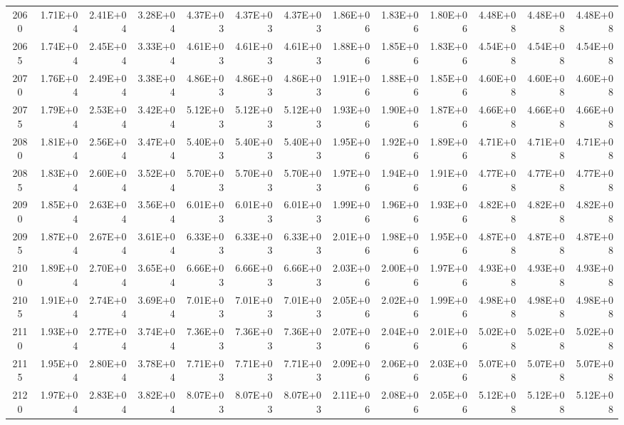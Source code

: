 \documentclass{article}
\begin{document}
\begin{table}
\begin{tabular}{crrr|rrr|rrr|rrr}
2060     & 1.71E+04   & 2.41E+04   & 3.28E+04   & 4.37E+03   & 4.37E+03   & 4.37E+03   & 1.86E+06   & 1.83E+06   & 1.80E+06   & 4.48E+08   & 4.48E+08   & 4.48E+08   \\
2065     & 1.74E+04   & 2.45E+04   & 3.33E+04   & 4.61E+03   & 4.61E+03   & 4.61E+03   & 1.88E+06   & 1.85E+06   & 1.83E+06   & 4.54E+08   & 4.54E+08   & 4.54E+08   \\
2070     & 1.76E+04   & 2.49E+04   & 3.38E+04   & 4.86E+03   & 4.86E+03   & 4.86E+03   & 1.91E+06   & 1.88E+06   & 1.85E+06   & 4.60E+08   & 4.60E+08   & 4.60E+08   \\
2075     & 1.79E+04   & 2.53E+04   & 3.42E+04   & 5.12E+03   & 5.12E+03   & 5.12E+03   & 1.93E+06   & 1.90E+06   & 1.87E+06   & 4.66E+08   & 4.66E+08   & 4.66E+08   \\
2080     & 1.81E+04   & 2.56E+04   & 3.47E+04   & 5.40E+03   & 5.40E+03   & 5.40E+03   & 1.95E+06   & 1.92E+06   & 1.89E+06   & 4.71E+08   & 4.71E+08   & 4.71E+08   \\
2085     & 1.83E+04   & 2.60E+04   & 3.52E+04   & 5.70E+03   & 5.70E+03   & 5.70E+03   & 1.97E+06   & 1.94E+06   & 1.91E+06   & 4.77E+08   & 4.77E+08   & 4.77E+08   \\
2090     & 1.85E+04   & 2.63E+04   & 3.56E+04   & 6.01E+03   & 6.01E+03   & 6.01E+03   & 1.99E+06   & 1.96E+06   & 1.93E+06   & 4.82E+08   & 4.82E+08   & 4.82E+08   \\
2095     & 1.87E+04   & 2.67E+04   & 3.61E+04   & 6.33E+03   & 6.33E+03   & 6.33E+03   & 2.01E+06   & 1.98E+06   & 1.95E+06   & 4.87E+08   & 4.87E+08   & 4.87E+08   \\
2100     & 1.89E+04   & 2.70E+04   & 3.65E+04   & 6.66E+03   & 6.66E+03   & 6.66E+03   & 2.03E+06   & 2.00E+06   & 1.97E+06   & 4.93E+08   & 4.93E+08   & 4.93E+08   \\
2105     & 1.91E+04   & 2.74E+04   & 3.69E+04   & 7.01E+03   & 7.01E+03   & 7.01E+03   & 2.05E+06   & 2.02E+06   & 1.99E+06   & 4.98E+08   & 4.98E+08   & 4.98E+08   \\
2110     & 1.93E+04   & 2.77E+04   & 3.74E+04   & 7.36E+03   & 7.36E+03   & 7.36E+03   & 2.07E+06   & 2.04E+06   & 2.01E+06   & 5.02E+08   & 5.02E+08   & 5.02E+08   \\
2115     & 1.95E+04   & 2.80E+04   & 3.78E+04   & 7.71E+03   & 7.71E+03   & 7.71E+03   & 2.09E+06   & 2.06E+06   & 2.03E+06   & 5.07E+08   & 5.07E+08   & 5.07E+08   \\
2120     & 1.97E+04   & 2.83E+04   & 3.82E+04   & 8.07E+03   & 8.07E+03   & 8.07E+03   & 2.11E+06   & 2.08E+06   & 2.05E+06   & 5.12E+08   & 5.12E+08   & 5.12E+08   \\

\end{tabular}
\end{table}
\end{document}
